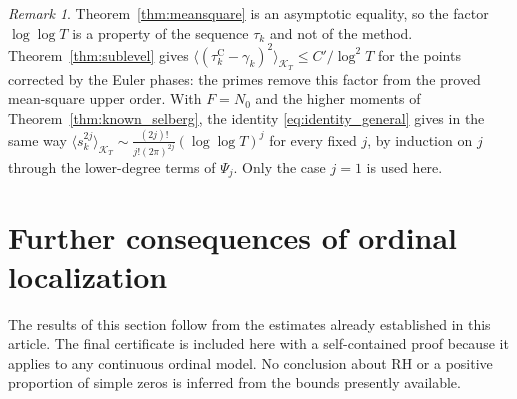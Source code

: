 \documentclass[11pt,a4paper]{article}
\makeatletter
\numberwithin{equation}{section}
\DeclareRobustCommand{\CGref}[1]{\ref{#1}}
\DeclareRobustCommand{\CGeqref}[1]{\eqref{#1}}
\let\CG@origref\ref
\let\CG@origeqref\eqref
\newcommand{\CG@gettip}[1]{\@ifundefined{CGTip@#1}{#1}{\csname CGTip@#1\endcsname}}
\DeclareRobustCommand{\CGref}[1]{\pdftooltip{\CG@origref{#1}}{\CG@gettip{#1}}}
\DeclareRobustCommand{\CGeqref}[1]{\pdftooltip{\CG@origeqref{#1}}{\CG@gettip{#1}}}
\theoremstyle{definition}
\theoremstyle{remark}
\newtheorem{remark}[theorem]{Remark}
\newcommand{\Nz}{N_0} %
\newcommand{\Kc}{\mathcal K}
\makeatother
\begin{document}
\begin{remark}\label{rem:meansquare_comparison}
Theorem~\CGref{thm:meansquare} is an asymptotic equality, so the factor $\log\log T$ is a property of the sequence $\tau_k$ and not of the method. Theorem~\CGref{thm:sublevel} gives $\langle(\tau_{k}^{\mathrm C}-\gamma_k)^2\rangle_{\Kc_T}\le C'/\log^2T$ for the points corrected by the Euler phases: the primes remove this factor from the proved mean-square upper order. With $F=\Nz$ and the higher moments of Theorem~\CGref{thm:known_selberg}, the identity \CGeqref{eq:identity_general} gives in the same way $\langle s_k^{2j}\rangle_{\Kc_T}\sim\frac{(2j)!}{j!(2\pi)^{2j}}(\log\log T)^j$ for every fixed $j$, by induction on $j$ through the lower-degree terms of $\Psi_j$. Only the case $j=1$ is used here.
\end{remark}


\section{Further consequences of ordinal localization}\label{sec:additional}
The results of this section follow from the estimates already established in this article. The final certificate is included here with a self-contained proof because it applies to any continuous ordinal model. No conclusion about RH or a positive proportion of simple zeros is inferred from the bounds presently available.
\end{document}
